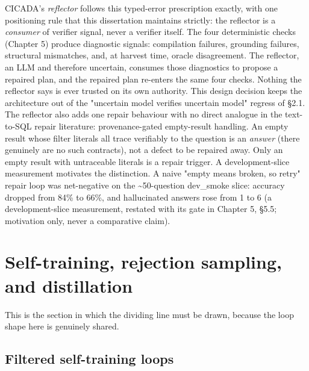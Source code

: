 CICADA's \emph{reflector} follows this typed-error prescription exactly, with one positioning rule that this dissertation maintains strictly: the reflector is a \emph{consumer} of verifier signal, never a verifier itself. The four deterministic checks (Chapter 5) produce diagnostic signals: compilation failures, grounding failures, structural mismatches, and, at harvest time, oracle disagreement. The reflector, an LLM and therefore uncertain, consumes those diagnostics to propose a repaired plan, and the repaired plan re-enters the same four checks. Nothing the reflector says is ever trusted on its own authority. This design decision keeps the architecture out of the "uncertain model verifies uncertain model" regress of §2.1. The reflector also adds one repair behaviour with no direct analogue in the text-to-SQL repair literature: provenance-gated empty-result handling. An empty result whose filter literals all trace verifiably to the question is an \emph{answer} (there genuinely are no such contracts), not a defect to be repaired away. Only an empty result with untraceable literals is a repair trigger. A development-slice measurement motivates the distinction. A naive "empty means broken, so retry" repair loop was net-negative on the \textasciitilde{}50-question dev\_smoke slice: accuracy dropped from 84\% to 66\%, and hallucinated answers rose from 1 to 6 (a development-slice measurement, restated with its gate in Chapter 5, §5.5; motivation only, never a comparative claim).

\section{Self-training, rejection sampling, and distillation}\label{sec:self-training-rejection-sampling-and-dis}

This is the section in which the dividing line must be drawn, because the loop shape here is genuinely shared.

\subsection{Filtered self-training loops}\label{sec:filtered-self-training-loops}

